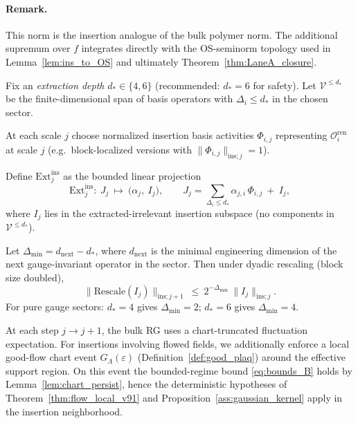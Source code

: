 \paragraph{Remark.}
This norm is the insertion analogue of the bulk polymer norm.
The additional supremum over $f$ integrates directly with the OS-seminorm topology used in Lemma~\ref{lem:ins_to_OS} and ultimately Theorem~\ref{thm:LaneA_closure}.

Fix an \emph{extraction depth} $d_\ast\in\{4,6\}$ (recommended: $d_\ast=6$ for safety).
Let $\mathcal V^{\le d_\ast}$ be the finite-dimensional span of basis operators with $\Delta_i\le d_\ast$ in the chosen sector.

At each scale $j$ choose normalized insertion basis activities $\Phi_{i,j}$ representing $\mathcal O_i^{\mathrm{ren}}$ at scale $j$
(e.g.\ block-localized versions with $\|\Phi_{i,j}\|_{\mathrm{ins};j}=1$).

\begin{definition}\label{def:Ext_ins}
Define $\mathrm{Ext}^{\mathrm{ins}}_j$ as the bounded linear projection
\[
\mathrm{Ext}^{\mathrm{ins}}_j:\ J_j\ \mapsto\ \Big(\alpha_j,\ I_j\Big),
\qquad
J_j=\sum_{\Delta_i\le d_\ast}\alpha_{j,i}\,\Phi_{i,j}\ +\ I_j,
\]
where $I_j$ lies in the extracted-irrelevant insertion subspace (no components in $\mathcal V^{\le d_\ast}$).
\end{definition}

\begin{proposition}\label{ass:gap_ins}
Let $\Delta_{\min}=d_{\mathrm{next}}-d_\ast$, where $d_{\mathrm{next}}$ is the minimal engineering dimension of the next gauge-invariant operator in the sector.
Then under dyadic rescaling (block size doubled),
\[
\|\mathrm{Rescale}(I_j)\|_{\mathrm{ins};j+1}\ \le\ 2^{-\Delta_{\min}}\ \|I_j\|_{\mathrm{ins};j}.
\]
For pure gauge sectors: $d_\ast=4$ gives $\Delta_{\min}=2$; $d_\ast=6$ gives $\Delta_{\min}=4$.
\end{proposition}

At each step $j\to j+1$, the bulk RG uses a chart-truncated fluctuation expectation.
For insertions involving flowed fields, we additionally enforce a local good-flow chart event $G_{\Lambda}(\varepsilon)$
(Definition~\ref{def:good_plaq}) around the effective support region. On this event the bounded-regime bound \eqref{eq:bounds_B} holds
by Lemma~\ref{lem:chart_persist}, hence the deterministic hypotheses of Theorem~\ref{thm:flow_local_v91} and Proposition~\ref{ass:gaussian_kernel}
apply in the insertion neighborhood.


